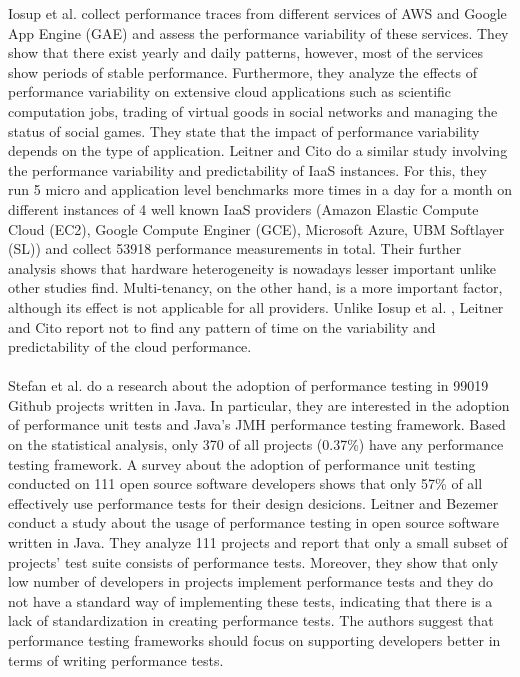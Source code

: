 \documentclass{seal_thesis}
\begin{document}
Iosup et al. \cite{Iosup} collect performance traces from different services of AWS and Google App Engine (GAE) and assess the performance variability of these services. They show that there exist yearly and daily patterns, however, most of the services show periods of stable performance. Furthermore, they analyze the effects of performance variability on extensive cloud applications such as scientific computation jobs, trading of virtual goods in social networks and managing the status of social games. They state that the impact of performance variability depends on the type of application. Leitner and Cito \cite{Leitner:2016:PCS:2926746.2885497} do a similar study involving the performance variability and predictability of IaaS instances. For this, they run 5 micro and application level benchmarks more times in a day for a month on different instances of 4 well known IaaS providers (Amazon Elastic Compute Cloud (EC2), Google Compute Enginer (GCE), Microsoft Azure, UBM Softlayer (SL)) and collect 53918 performance measurements in total. Their further analysis shows that hardware heterogeneity is nowadays lesser important unlike other studies find. Multi-tenancy, on the other hand, is a more important factor, although its effect is not applicable for all providers. Unlike Iosup et al. \cite{Iosup}, Leitner and Cito \cite{Leitner:2016:PCS:2926746.2885497} report not to find any pattern of time on the variability and predictability of the cloud performance.\\
\\
Stefan et al. \cite{Stefan:2017:UTP:3030207.3030226} do a research about the adoption of performance testing in 99019 Github projects written in Java. In particular, they are interested in the adoption of performance unit tests and Java's JMH performance testing framework. Based on the statistical analysis, only 370 of all projects (0.37\%) have any performance testing framework. A survey about the adoption of performance unit testing conducted on 111 open source software developers shows that only 57\% of all effectively use performance tests for their design desicions. Leitner and Bezemer \cite{Leitner:2017:ESS:3030207.3030213} conduct a study about the usage of performance testing in open source software written in Java. They analyze 111 projects and report that only a small subset of projects' test suite consists of performance tests. Moreover, they show that only low number of developers in projects implement performance tests and they do not have a standard way of implementing these tests, indicating that there is a lack of standardization in creating performance tests. The authors suggest that performance testing frameworks should focus on supporting developers better in terms of writing performance tests.\\
\end{document}
